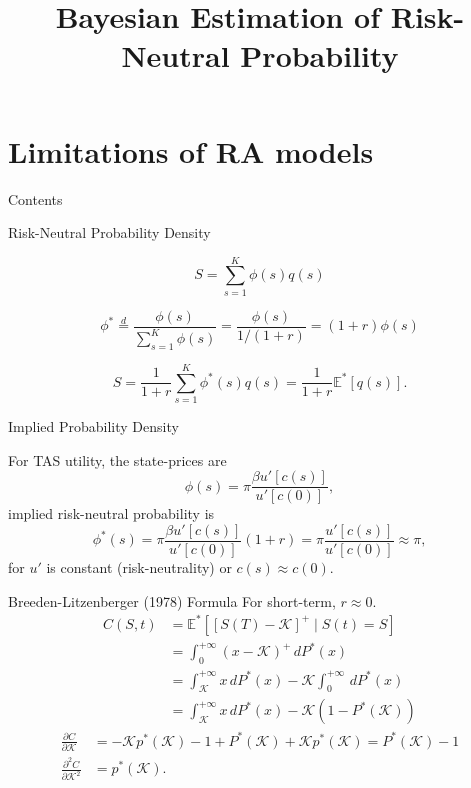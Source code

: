 \documentclass[10pt,aspectratio=43]{beamer}
\title{Bayesian Estimation of Risk-Neutral Probability}
\begin{document}
\begin{frame}[fragile]
    \titlepage
\end{frame}



\section{Limitations of RA models}
\begin{frame}[fragile]{Contents}
    \large
    \tableofcontents[currentsection]
\end{frame}

\begin{frame}{ Risk-Neutral Probability Density}

    \[S=\sum_{s=1}^K\phi(s)q(s)\]

    \[\phi^*\overset{d}{=}\frac{\phi(s)}{\sum_{s=1}^K\phi(s)}=\frac{\phi(s)}{1/(1+r)}=(1+r)\phi(s)\]

    \[S=\frac{1}{1+r}\sum_{s=1}^K\phi^*(s)q(s)=\frac{1}{1+r}\mathbb{E}^*[q(s)].\]

\end{frame}
\begin{frame}{Implied  Probability Density}
 
    For TAS utility, the state-prices are 
    \[\phi(s)=\pi\frac{\beta u'[c(s)]}{u'[c(0)]},\]
    \then implied risk-neutral probability is
    \[\phi^*(s)=\pi\frac{\beta u'[c(s)]}{u'[c(0)]}(1+r)= \pi\frac{u'[c(s)]}{u'[c(0)]}\approx \pi,\]
    for $u'$ is constant (risk-neutrality) or $c(s)\approx c(0)$.


\end{frame}

\begin{frame}{Breeden-Litzenberger (1978) Formula}
\nocite{breedenPricesStateContingentClaims1978}
For short-term, $r\approx 0$.
    \begin{align*}
        C(S,t)&=\mathbb{E}^*\left[[S(T)-\mathcal{K}]^+\mid S(t)=S\right]\\ 
        &=\int_0^{+\infty}(x-\mathcal{K})^+\,dP^*(x)\\ &=\int_{\mathcal{K}}^{+\infty}x\,dP^*(x)-\mathcal{K}\int_0^{+\infty}\,dP^*(x)\\ 
        &=\int_{\mathcal{K}}^{+\infty}x\,dP^*(x)-\mathcal{K}(1-P^*(\mathcal{K}))
    \end{align*}
    \begin{align*}
        \frac{\partial C}{\partial \mathcal{K}}&=-\mathcal{K}p^*(\mathcal{K})-1+P^*(\mathcal{K})+\mathcal{K}p^*(\mathcal{K})=P^*(\mathcal{K})-1\\ 
        \frac{\partial^2 C}{\partial \mathcal{K}^2}&=p^*(\mathcal{K}).
    \end{align*}
 \cite{ait-sahaliaNonparametricOptionPricing2003}

\end{frame}
\end{document}

